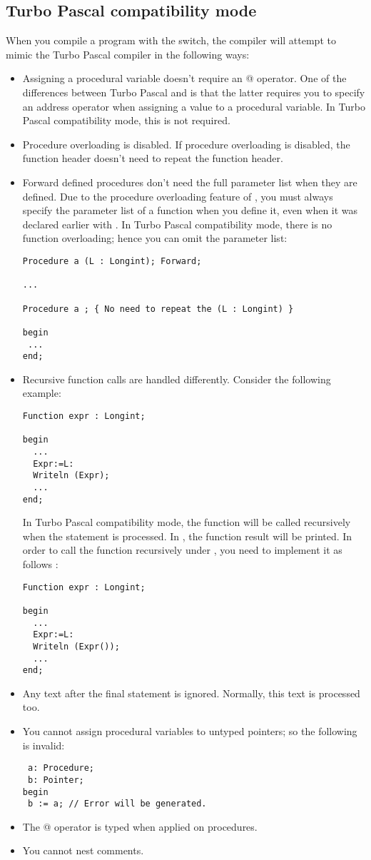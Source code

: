\subsection{Turbo Pascal compatibility mode}
When you compile a program with the  switch, the compiler will
attempt to mimic the Turbo Pascal compiler in the following ways:
\begin{itemize}
\item Assigning a procedural variable doesn't require an @ operator. One of
the differences between Turbo Pascal and \fpc is that the latter requires
you to specify an address operator when assigning a value to a procedural
variable. In Turbo Pascal compatibility mode, this is not required.
\item Procedure overloading is disabled. If procedure overloading is
disabled, the function header doesn't need to repeat the function header.

\item Forward defined procedures don't need the full parameter list when
they are defined. Due to the procedure overloading feature of \fpc, you must
always specify the parameter list of a function when you define it, even
when it was declared earlier with . In Turbo Pascal
compatibility mode, there is no function overloading; hence you can omit the
parameter list:
\begin{verbatim}
Procedure a (L : Longint); Forward;

...

Procedure a ; { No need to repeat the (L : Longint) }

begin
 ...
end;

\end{verbatim}
\item Recursive function calls are handled differently. Consider the
following example:
\begin{verbatim}
Function expr : Longint;

begin
  ...
  Expr:=L:
  Writeln (Expr);
  ...
end;
\end{verbatim}
In Turbo Pascal compatibility mode, the function will be called recursively
when the  statement is processed. In \fpc, the function result
will be printed. In order to call the function recursively under \fpc, you
need to implement it as follows :
\begin{verbatim}
Function expr : Longint;

begin
  ...
  Expr:=L:
  Writeln (Expr());
  ...
end;
\end{verbatim}
\item Any text after the final  statement is ignored. Normally,
this text is processed too.
\item You cannot assign procedural variables to untyped pointers; so the
following is invalid:
\begin{verbatim}
 a: Procedure;
 b: Pointer;
begin
 b := a; // Error will be generated.
\end{verbatim}
\item The @ operator is typed when applied on procedures.
\item You cannot nest comments.
\end{itemize}


